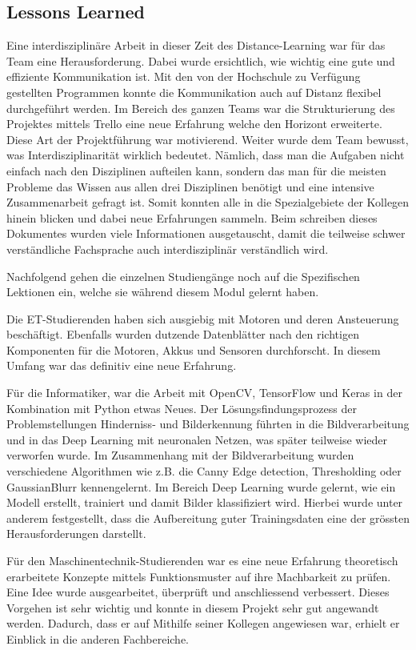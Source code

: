 \subsection{Lessons Learned}
Eine interdisziplinäre Arbeit in dieser Zeit des Distance-Learning war für das Team eine Herausforderung. Dabei wurde ersichtlich, wie wichtig eine gute und effiziente Kommunikation ist. Mit den von der Hochschule zu Verfügung gestellten Programmen konnte die Kommunikation auch auf Distanz flexibel durchgeführt werden. Im Bereich des ganzen Teams war die Strukturierung des Projektes mittels Trello eine neue Erfahrung welche den Horizont erweiterte. Diese Art der Projektführung war motivierend. Weiter wurde dem Team bewusst, was Interdisziplinarität wirklich bedeutet. Nämlich, dass man die Aufgaben nicht einfach nach den Disziplinen aufteilen kann, sondern das man für die meisten Probleme das Wissen aus allen drei Disziplinen benötigt und eine intensive Zusammenarbeit gefragt ist. Somit konnten alle in die Spezialgebiete der Kollegen hinein blicken und dabei neue Erfahrungen sammeln. Beim schreiben dieses Dokumentes wurden viele Informationen ausgetauscht, damit die teilweise schwer verständliche Fachsprache auch interdisziplinär verständlich wird.

Nachfolgend gehen die einzelnen Studiengänge noch auf die Spezifischen Lektionen ein, welche sie während diesem Modul gelernt haben.

Die ET-Studierenden haben sich ausgiebig mit Motoren und deren Ansteuerung beschäftigt. Ebenfalls wurden dutzende Datenblätter nach den richtigen Komponenten für die Motoren, Akkus und Sensoren durchforscht. In diesem Umfang war das definitiv eine neue Erfahrung.

Für die Informatiker, war die Arbeit mit OpenCV, TensorFlow und Keras in der Kombination mit Python etwas Neues. Der Lösungsfindungsprozess der Problemstellungen Hinderniss- und Bilderkennung führten in die Bildverarbeitung und in das Deep Learning mit neuronalen Netzen, was später teilweise wieder verworfen wurde.
Im Zusammenhang mit der Bildverarbeitung wurden verschiedene Algorithmen wie z.B. die Canny Edge detection, Thresholding oder GaussianBlurr kennengelernt. 
Im Bereich Deep Learning wurde gelernt, wie ein Modell erstellt, trainiert und damit Bilder klassifiziert wird. Hierbei wurde unter anderem festgestellt, dass die Aufbereitung guter Trainingsdaten eine der grössten Herausforderungen darstellt. 

Für den Maschinentechnik-Studierenden war es eine neue Erfahrung theoretisch erarbeitete Konzepte mittels Funktionsmuster auf ihre Machbarkeit zu prüfen. Eine Idee wurde ausgearbeitet, überprüft und anschliessend verbessert. Dieses Vorgehen ist sehr wichtig und konnte in diesem Projekt sehr gut angewandt werden.
Dadurch, dass er auf Mithilfe seiner Kollegen angewiesen war, erhielt er Einblick in die anderen Fachbereiche.






